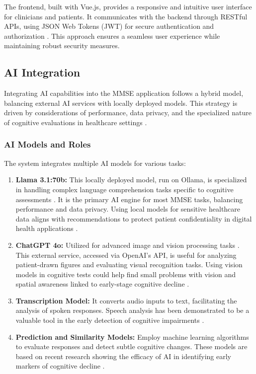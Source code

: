 The frontend, built with Vue.js, provides a responsive and intuitive user interface for clinicians and patients. It communicates with the backend through RESTful APIs, using JSON Web Tokens (JWT) for secure authentication and authorization \cite{Jones2015}. This approach ensures a seamless user experience while maintaining robust security measures.

\newpage
\subsection{AI Integration}
Integrating AI capabilities into the MMSE application follows a hybrid model, balancing external AI services with locally deployed models. This strategy is driven by considerations of performance, data privacy, and the specialized nature of cognitive evaluations in healthcare settings \cite{Bauer2012}.

\subsubsection{AI Models and Roles}
The system integrates multiple AI models for various tasks:
\begin{enumerate}
\item \textbf{Llama 3.1:70b:} This locally deployed model, run on Ollama, is specialized in handling complex language comprehension tasks specific to cognitive assessments \cite{Ollama2024}. It is the primary AI engine for most MMSE tasks, balancing performance and data privacy. Using local models for sensitive healthcare data aligns with recommendations to protect patient confidentiality in digital health applications \cite{Krutz2017}.
\item \textbf{ChatGPT 4o:} Utilized for advanced image and vision processing tasks \cite{Openai2024}. This external service, accessed via OpenAI's API, is useful for analyzing patient-drawn figures and evaluating visual recognition tasks. Using vision models in cognitive tests could help find small problems with vision and spatial awareness linked to early-stage cognitive decline \cite{Bowers2021}.
\item \textbf{Transcription Model:} It converts audio inputs to text, facilitating the analysis of spoken responses. Speech analysis has been demonstrated to be a valuable tool in the early detection of cognitive impairments \cite{Konig2015}.
\item \textbf{Prediction and Similarity Models:} Employ machine learning algorithms to evaluate responses and detect subtle cognitive changes. These models are based on recent research showing the efficacy of AI in identifying early markers of cognitive decline \cite{Grassi2019}.
\end{enumerate}

